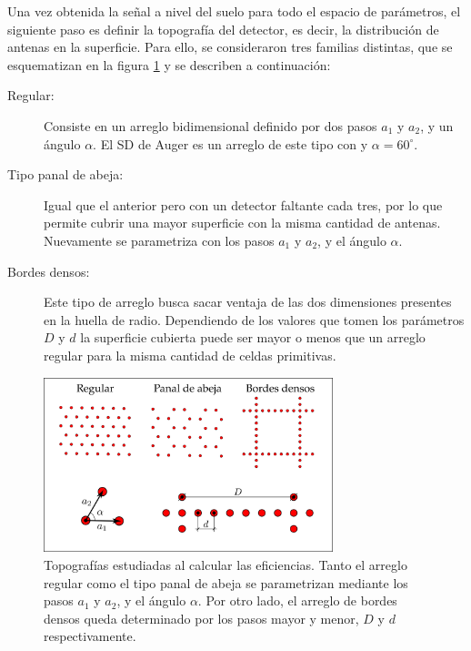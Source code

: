 	Una vez obtenida la se\~nal a nivel del suelo para todo el espacio de par\'ametros, el siguiente paso es definir la topograf\'ia del detector, es decir, la distribuci\'on de antenas en la superficie.
	Para ello, se consideraron tres familias distintas, que se esquematizan en la figura \ref{fig:topoRadio} y se describen a continuaci\'on:
	\begin{description}
	 \item[Regular:] Consiste en un arreglo bidimensional definido por dos pasos $a_1$ y $a_2$, y un \'angulo $\alpha$. El SD de Auger es un arreglo de este tipo con  y $\alpha=60^\circ$.
	 \item[Tipo panal de abeja:] Igual que el anterior pero con un detector faltante cada tres, por lo que permite cubrir una mayor superficie con la misma cantidad de antenas. Nuevamente se parametriza con los pasos $a_1$ y $a_2$, y el \'angulo $\alpha$. 
	 \item[Bordes densos:] Este tipo de arreglo busca sacar ventaja de las dos dimensiones presentes en la huella de radio. Dependiendo de los valores que tomen los par\'ametros $D$ y $d$ la superficie cubierta puede ser mayor o menos que un arreglo regular para la misma cantidad de celdas primitivas.  
	\end{description}
	\begin{figure}[h!]
		\begin{center}
			\includegraphics[width=0.75\textwidth]{fig/resultadosRadio/topografia}
			\caption{\label{fig:topoRadio} Topograf\'ias estudiadas al calcular las eficiencias. Tanto el arreglo regular como el tipo panal de abeja se parametrizan mediante los pasos $a_1$ y $a_2$, y el \'angulo $\alpha$. Por otro lado, el arreglo de bordes densos queda determinado por los pasos mayor y menor, $D$ y $d$ respectivamente.
			}
		\end{center}
	\end{figure}
	
